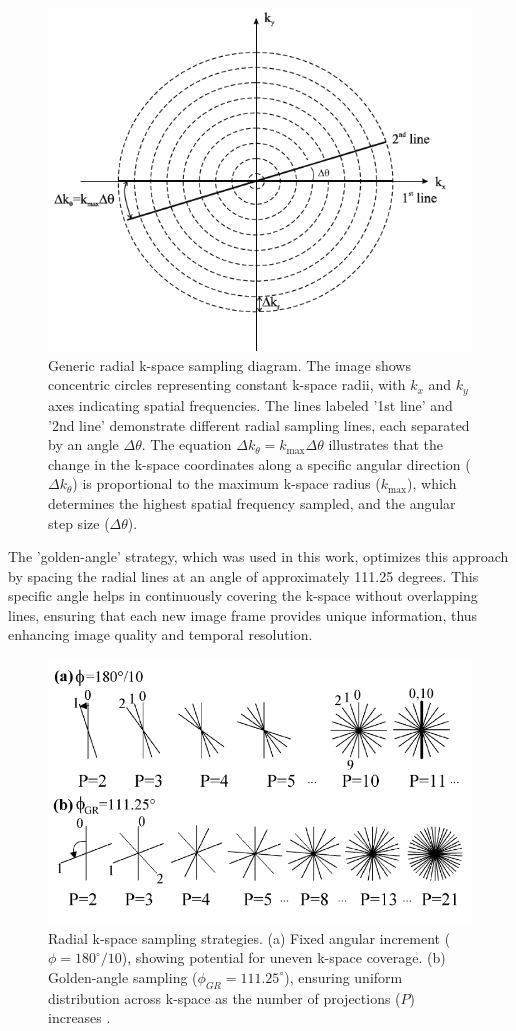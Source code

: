 \documentclass{micro-econ-thesis}
\begin{document}
 \begin{figure}[H]
 	\centering
 	\includegraphics[width=0.7\linewidth]{radial}
 	\caption{Generic radial k-space sampling diagram. The image shows concentric circles representing constant k-space radii, with $k_x$ and $k_y$ axes indicating spatial frequencies. The lines labeled '1st line' and '2nd line' demonstrate different radial sampling lines, each separated by an angle $\Delta \theta$. The equation $\Delta k_{\theta} = k_{\text{max}} \Delta \theta$ illustrates that the change in the k-space coordinates along a specific angular direction ($\Delta k_{\theta}$) is proportional to the maximum k-space radius ($k_{\text{max}}$), which determines the highest spatial frequency sampled, and the angular step size ($\Delta \theta$).
 		 \parencite[p.306]{brown_magnetic_2014}}
 	\label{fig:radial}
 \end{figure}
 
 The 'golden-angle' strategy, which was used in this work, optimizes this approach by spacing the radial lines at an angle of approximately 111.25 degrees. This specific angle helps in continuously covering the k-space without overlapping lines, ensuring that each new image frame provides unique information, thus enhancing image quality and temporal resolution. 
 
\begin{figure}[H]
	\centering
	\includegraphics[width=0.7\linewidth]{golden_angle_figure}
	\caption{Radial k-space sampling strategies. (a) Fixed angular increment ($\phi = 180^\circ / 10$), showing potential for uneven k-space coverage. (b) Golden-angle sampling ($\phi_{GR} = 111.25^\circ$), ensuring uniform distribution across k-space as the number of projections ($P$) increases \parencite{winkelmann_optimal_2007}.}
	\label{fig:goldenanglefigure}
\end{figure}
\end{document}
